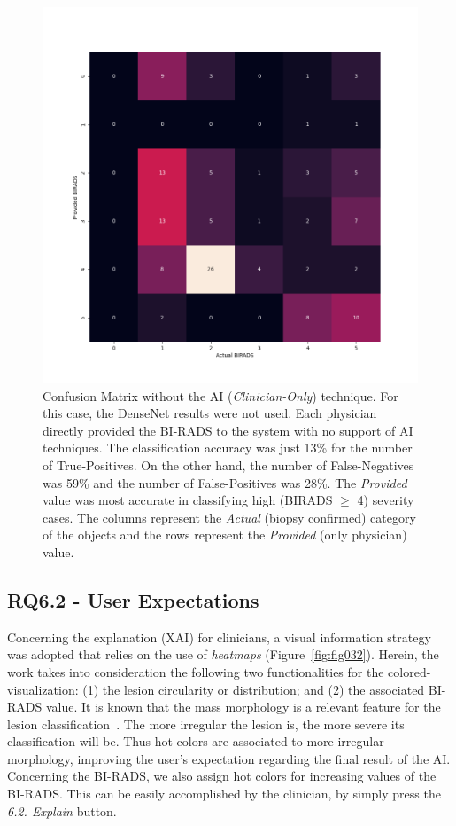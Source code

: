 \begin{figure}[htbp]
\centering
\includegraphics[width=\textwidth]{images/fig044}
\caption{Confusion Matrix without the AI ({\it Clinician-Only}) technique. For this case, the DenseNet results were not used. Each physician directly provided the BI-RADS to the system with no support of AI techniques. The classification accuracy was just 13\% for the number of True-Positives. On the other hand, the number of False-Negatives was 59\% and the number of False-Positives was 28\%. The {\it Provided} value was most accurate in classifying high (BIRADS $\ge$ 4) severity cases. The columns represent the {\it Actual} (biopsy confirmed) category of the objects and the rows represent the {\it Provided} (only physician) value.}
\label{fig:fig044}
\end{figure}

\subsection{RQ6.2 - User Expectations}
\label{sec:app002006002}

Concerning the explanation (\ac{XAI}) for clinicians, a visual information strategy was adopted that relies on the use of {\it heatmaps} (Figure~\ref{fig:fig032}).
Herein, the work takes into consideration the following two functionalities for the colored-visualization:
(1) the lesion circularity or distribution; and
(2) the associated \ac{BI-RADS} value.
It is known that the mass morphology is a relevant feature for the lesion classification~\cite{maicas2018training}.
The more irregular the lesion is, the more severe its classification will be.
Thus hot colors are associated to more irregular morphology, improving the user's expectation regarding the final result of the \ac{AI}.
Concerning the \ac{BI-RADS}, we also assign hot colors for increasing values of the \ac{BI-RADS}. 
This can be easily accomplished by the clinician, by simply press the {\it 6.2. Explain} button.

